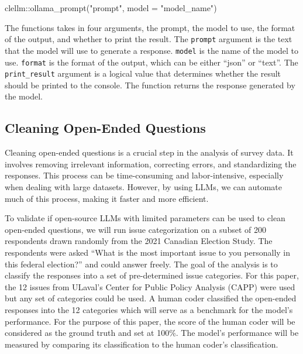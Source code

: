\documentclass[
  authoryear,
  preprint,
  3p]{elsarticle}
\newenvironment{Shaded}{\begin{snugshade}}{\end{snugshade}}
\newcommand{\AttributeTok}[1]{\textcolor[rgb]{0.40,0.45,0.13}{#1}}
\newcommand{\FunctionTok}[1]{\textcolor[rgb]{0.28,0.35,0.67}{#1}}
\newcommand{\NormalTok}[1]{\textcolor[rgb]{0.00,0.23,0.31}{#1}}
\newcommand{\SpecialCharTok}[1]{\textcolor[rgb]{0.37,0.37,0.37}{#1}}
\newcommand{\StringTok}[1]{\textcolor[rgb]{0.13,0.47,0.30}{#1}}
\begin{document}
\begin{Shaded}
\begin{Highlighting}[]
\NormalTok{clellm}\SpecialCharTok{::}\FunctionTok{ollama\_prompt}\NormalTok{(}\StringTok{"prompt"}\NormalTok{, }\AttributeTok{model =} \StringTok{"model\_name"}\NormalTok{)}
\end{Highlighting}
\end{Shaded}

The functions takes in four arguments, the prompt, the model to use, the
format of the output, and whether to print the result. The
\texttt{prompt} argument is the text that the model will use to generate
a response. \texttt{model} is the name of the model to use.
\texttt{format} is the format of the output, which can be either
``json'' or ``text''. The \texttt{print\_result} argument is a logical
value that determines whether the result should be printed to the
console. The function returns the response generated by the model.

\subsection{Cleaning Open-Ended
Questions}\label{cleaning-open-ended-questions}

Cleaning open-ended questions is a crucial step in the analysis of
survey data. It involves removing irrelevant information, correcting
errors, and standardizing the responses. This process can be
time-consuming and labor-intensive, especially when dealing with large
datasets. However, by using LLMs, we can automate much of this process,
making it faster and more efficient.

To validate if open-source LLMs with limited parameters can be used to
clean open-ended questions, we will run issue categorization on a subset
of 200 respondents drawn randomly from the 2021 Canadian Election Study.
The respondents were asked ``What is the most important issue to you
personally in this federal election?'' and could answer freely. The goal
of the analysis is to classify the responses into a set of
pre-determined issue categories. For this paper, the 12 issues from
ULaval's Center for Public Policy Analysis (CAPP) were used but any set
of categories could be used. A human coder classified the open-ended
responses into the 12 categories which will serve as a benchmark for the
model's performance. For the purpose of this paper, the score of the
human coder will be considered as the ground truth and set at 100\%. The
model's performance will be measured by comparing its classification to
the human coder's classification.
\end{document}
